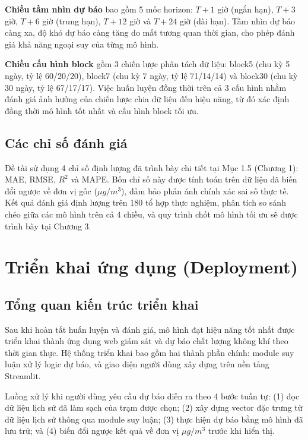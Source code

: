 \textbf{Chiều tầm nhìn dự báo} bao gồm 5 mốc horizon: $T+1$ giờ (ngắn hạn), $T+3$ giờ, $T+6$ giờ (trung hạn), $T+12$ giờ và $T+24$ giờ (dài hạn). Tầm nhìn dự báo càng xa, độ khó dự báo càng tăng do mất tương quan thời gian, cho phép đánh giá khả năng ngoại suy của từng mô hình.

\textbf{Chiều cấu hình block} gồm 3 chiến lược phân tách dữ liệu: block5 (chu kỳ 5 ngày, tỷ lệ 60/20/20), block7 (chu kỳ 7 ngày, tỷ lệ 71/14/14) và block30 (chu kỳ 30 ngày, tỷ lệ 67/17/17). Việc huấn luyện đồng thời trên cả 3 cấu hình nhằm đánh giá ảnh hưởng của chiến lược chia dữ liệu đến hiệu năng, từ đó xác định đồng thời mô hình tốt nhất và cấu hình block tối ưu.

\subsection{Các chỉ số đánh giá}

Đề tài sử dụng 4 chỉ số định lượng đã trình bày chi tiết tại Mục 1.5 (Chương 1): MAE, RMSE, $R^2$ và MAPE. Bốn chỉ số này được tính toán trên dữ liệu đã biến đổi ngược về đơn vị gốc ($\mu g/m^3$), đảm bảo phản ánh chính xác sai số thực tế. Kết quả đánh giá định lượng trên 180 tổ hợp thực nghiệm, phân tích so sánh chéo giữa các mô hình trên cả 4 chiều, và quy trình chốt mô hình tối ưu sẽ được trình bày tại Chương 3.

\section{Triển khai ứng dụng (Deployment)}

\subsection{Tổng quan kiến trúc triển khai}

Sau khi hoàn tất huấn luyện và đánh giá, mô hình đạt hiệu năng tốt nhất được triển khai thành ứng dụng web giám sát và dự báo chất lượng không khí theo thời gian thực. Hệ thống triển khai bao gồm hai thành phần chính: module suy luận xử lý logic dự báo, và giao diện người dùng xây dựng trên nền tảng Streamlit.

Luồng xử lý khi người dùng yêu cầu dự báo diễn ra theo 4 bước tuần tự: (1) đọc dữ liệu lịch sử đã làm sạch của trạm được chọn; (2) xây dựng vector đặc trưng từ dữ liệu lịch sử thông qua module suy luận; (3) thực hiện dự báo bằng mô hình đã lưu trữ; và (4) biến đổi ngược kết quả về đơn vị $\mu g/m^3$ trước khi hiển thị.

